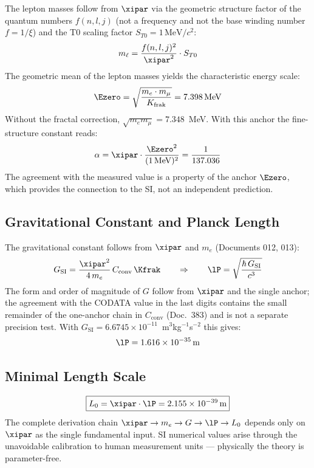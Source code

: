 The lepton masses follow from $\xipar$ via the geometric structure factor of the quantum numbers $f(n,l,j)$ (not a frequency and not the base winding number $f = 1/\xi$) and the T0 scaling factor $S_{T0} = 1\,\text{MeV}/c^2$:
\begin{equation}
	m_\ell = \frac{f(n,l,j)^2}{\xipar^2} \cdot S_{T0}
\end{equation}
The geometric mean of the lepton masses yields the characteristic energy scale:
\begin{equation}
	\Ezero = \sqrt{\frac{m_e \cdot m_\mu}{K_{\text{frak}}}} = 7{.}398\,\text{MeV}
\end{equation}
Without the fractal correction, $\sqrt{m_e m_\mu} = 7.348$~MeV. With this anchor the fine-structure constant reads:
\begin{equation}
	\alpha = \xipar \cdot \frac{\Ezero^2}{(1\,\text{MeV})^2} = \frac{1}{137{.}036}
\end{equation}
The agreement with the measured value is a property of the anchor $\Ezero$, which provides the connection to the SI, not an independent prediction.

\subsection{Gravitational Constant and Planck Length}

The gravitational constant follows from $\xipar$ and $m_e$ (Documents 012, 013):
\begin{equation}
	G_{\text{SI}} = \frac{\xipar^2}{4\,m_e}\,C_{\text{conv}}\,\Kfrak \qquad\Rightarrow\qquad \lP = \sqrt{\frac{\hbar\,G_{\text{SI}}}{c^3}}
\end{equation}
The form and order of magnitude of $G$ follow from $\xipar$ and the single anchor; the agreement with the CODATA value in the last digits contains the small remainder of the one-anchor chain in $C_{\text{conv}}$ (Doc.~383) and is not a separate precision test. With $G_{\text{SI}} = 6.6745\times10^{-11}$~m$^3$kg$^{-1}$s$^{-2}$ this gives:
\begin{equation}
	\lP = 1{.}616 \times 10^{-35}\,\text{m}
\end{equation}

\subsection{Minimal Length Scale}

\begin{keyresult}
\begin{equation}
	\boxed{L_0 = \xipar \cdot \lP = 2{.}155 \times 10^{-39}\,\text{m}}
\end{equation}
The complete derivation chain $\xipar \to m_e \to G \to \lP \to L_0$ depends only on $\xipar$ as the single fundamental input. SI numerical values arise through the unavoidable calibration to human measurement units — physically the theory is parameter-free.
\end{keyresult}

